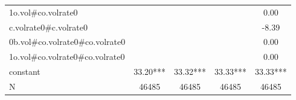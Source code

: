 {\begin{tabular}{l*{4}{c}}
1o.vol#co.volrate0  &               &               &               &        0.00   \\
c.volrate0#c.volrate0&               &               &               &       -8.39   \\
0b.vol#co.volrate0#co.volrate0&               &               &               &        0.00   \\
1o.vol#co.volrate0#co.volrate0&               &               &               &        0.00   \\
constant            &       33.20***&       33.32***&       33.33***&       33.33***\\
\hline
N                   &       46485   &       46485   &       46485   &       46485   \\
\hline\hline
\end{tabular}
}
